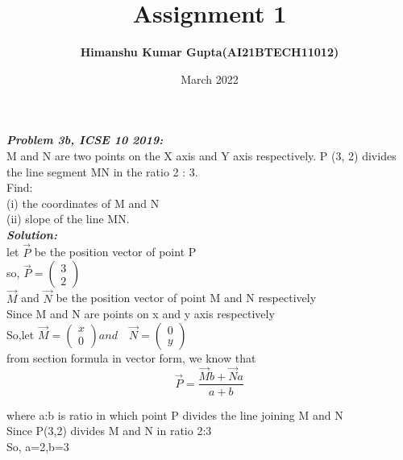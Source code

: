 \documentclass[journal,12pt,threecolumn]{IEEEtran}
\newcommand{\myvec}[1]{\ensuremath{\begin{pmatrix}#1\end{pmatrix}}}
\begin{document}
\title{Assignment 1}
\author{\textbf{Himanshu Kumar Gupta(AI21BTECH11012)}}
\maketitle
\date {March 2022}


\textbf{\textit{Problem 3b, ICSE 10 2019:}}\\

 M and N are two points on the X axis and Y axis respectively. 
P (3, 2) divides the line segment MN in the ratio 2 : 3.\\
Find:\\
(i)   the coordinates of M and N\\
(ii)  slope of the line MN.\\

\textbf{\textit{Solution:}}\\
 let $\vec{P}$ be the position vector of point P\\
  so, $\vec{P}=\myvec{3 \\ 2}$\\
 $\vec{M}$ and $\vec{N}$ be the position vector of point M and N respectively\\
Since M and N are points on x and y axis respectively\\
  So,let $\vec{M}=\myvec{x\\0} and\quad \vec{N}=\myvec{0\\y}$\\
  
  from section formula in vector form, we know that\\
  \begin{equation}
\vec{P}=\frac{\vec{M}b+\vec{N}a}{a+b}     \nonumber
  \end{equation}
 
  where a:b is ratio in which point P divides the line joining M and N\\
Since P(3,2) divides M and N in ratio 2:3\\
So, a=2,b=3\\
\end{document}

